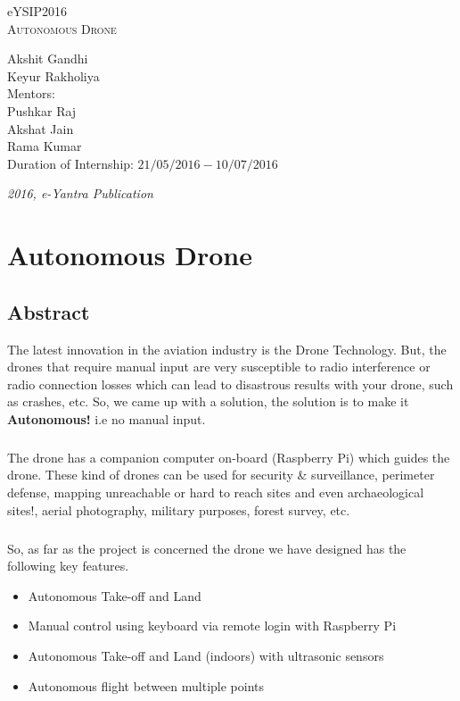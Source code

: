 \documentclass[a4paper,12pt,oneside]{book}
\begin{document}
\begin{titlepage}
\raggedright
{\Large eYSIP2016\\[1cm]}
{\Huge\scshape Autonomous Drone \\[.1in]}
\vfill
\begin{flushright}
{\large Akshit Gandhi \\}
{\large Keyur Rakholiya \\}
{\large Mentors: \\}
{\large Pushkar Raj\\}
{\large Akshat Jain \\}
{\large Rama Kumar \\}
{\large Duration of Internship: $ 21/05/2016-10/07/2016 $ \\}
\end{flushright}

{\itshape 2016, e-Yantra Publication}
\end{titlepage}

\chapter[Project Tag]{Autonomous Drone}
\section*{Abstract}
The latest innovation in the aviation industry is the Drone Technology. But, the drones that require manual input are very susceptible to radio interference or radio connection losses which can lead to disastrous results with your drone, such as crashes, etc. So, we came up with a solution, the solution is to make it \textbf{Autonomous!} i.e no manual input. 
\paragraph{}The drone has a companion computer on-board (Raspberry Pi) which guides the drone. These kind of drones can be used for security & surveillance, perimeter defense, mapping unreachable or hard to reach sites and even archaeological sites!, aerial photography, military purposes, forest survey, etc.
\paragraph{} So, as far as the project is concerned the drone we have designed has the following key features.
    \begin{itemize}
      \item Autonomous Take-off and Land
      \item Manual control using keyboard via remote login with Raspberry Pi
      \item Autonomous Take-off and Land (indoors) with ultrasonic sensors
      \item Autonomous flight between multiple points
    \end{itemize}
\end{document}
